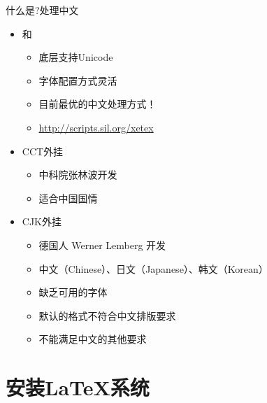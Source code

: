 \documentclass[xcolor=svgnames, t]{ctexbeamer}
\begin{document}
\begin{frame}[t]{什么是\latex?}{处理中文}
  \stretchon
  \begin{itemize}
  \item \alert{\XeTeX}和\alert{\XeLaTeX}
    \begin{itemize}
    \item 底层支持\alert{Unicode}
    \item 字体配置方式灵活
    \item \alert{目前最优的中文处理方式！}
    \item \url{http://scripts.sil.org/xetex}
    \end{itemize}
  \item CCT\alert{外挂}
    \begin{itemize}
    \item 中科院张林波开发
    \item 适合中国国情
    \end{itemize}  
  \item CJK\alert{外挂}
    \begin{itemize}
    \item 德国人 Werner Lemberg 开发
    \item 中文（\alert{C}hinese）、日文（\alert{J}apanese）、韩文（\alert{K}orean）
    \item 缺乏可用的字体
    \item 默认的格式不符合中文排版要求
    \item 不能满足中文的其他要求
    \end{itemize}  
  \end{itemize}
  \stretchoff
\end{frame}

\section[安装\LaTeX ]{安装\LaTeX 系统}\label{sec01-04}
\end{document}
